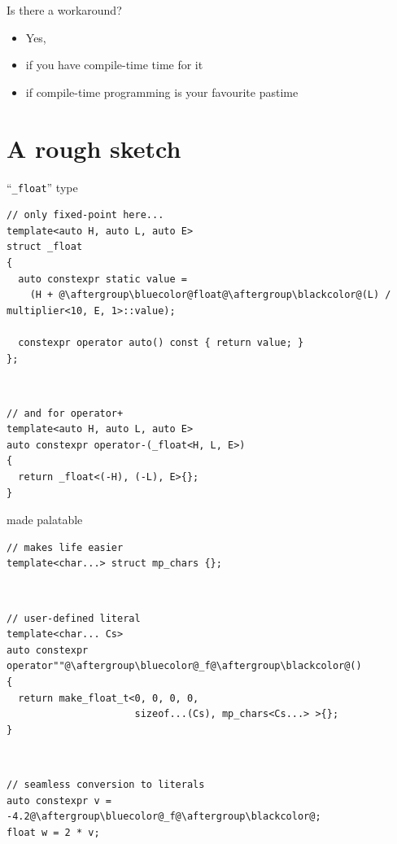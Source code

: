 \documentclass[xcolor=dvipsnames]{beamer}
\begin{document}
\begin{frame}[fragile]{Is there a workaround?}
  \begin{itemize}
  \item Yes, \vspace{5mm}
  \item if you have compile-time time for it \vspace{5mm}
  \item if compile-time programming is your favourite pastime \vspace{5mm}
  \end{itemize}
\end{frame}


\section{A rough sketch}


\begin{frame}[fragile]{``\texttt{\_float}'' type}
\begin{lstlisting}
// only fixed-point here...
template<auto H, auto L, auto E>
struct _float
{
  auto constexpr static value =
    (H + @\aftergroup\bluecolor@float@\aftergroup\blackcolor@(L) / multiplier<10, E, 1>::value);

  constexpr operator auto() const { return value; }
};
\end{lstlisting}

~

\begin{lstlisting}
// and for operator+
template<auto H, auto L, auto E>
auto constexpr operator-(_float<H, L, E>)
{
  return _float<(-H), (-L), E>{};
}
\end{lstlisting}
\end{frame}


\begin{frame}[fragile]{made palatable}
\begin{lstlisting}
// makes life easier
template<char...> struct mp_chars {};
\end{lstlisting}

~

\begin{lstlisting}
// user-defined literal
template<char... Cs>
auto constexpr operator""@\aftergroup\bluecolor@_f@\aftergroup\blackcolor@()
{
  return make_float_t<0, 0, 0, 0,
                      sizeof...(Cs), mp_chars<Cs...> >{};
}
\end{lstlisting}

~

\begin{lstlisting}
// seamless conversion to literals
auto constexpr v = -4.2@\aftergroup\bluecolor@_f@\aftergroup\blackcolor@;
float w = 2 * v;
\end{lstlisting}
\end{frame}
\end{document}
